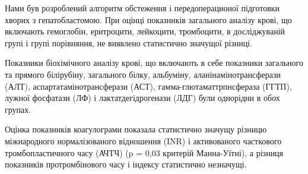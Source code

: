 Нами був розроблений алгоритм обстеження і передоперационої підготовки хворих з гепатобластомою.
При оцінці показників загального аналізу крові, що включають гемоглобін, еритроцити, лейкоцити, тромбоцити, в досліджуваній групі і групі порівняння, не виявлено статистично значущої різниці.

Показники біохімічного аналізу крові, що включають в себе показники загального та прямого білірубіну, загального білку, альбуміну, аланінамінотрансферази (АЛТ), аспартатамінотрансферази (АСТ), гамма-глютаматтрпнсфераза (ГГТП), лужної фосфатази (ЛФ) і лактатдегідрогенази (ЛДГ) були однорідни в обох групах.

Оцінка показників коагулограми показала статистично значущу різницю міжнародного нормалізованого відношення (INR) і активованого часткового тромбопластичного часу (АЧТЧ) (p = 0,03 критерій Манна-Уїтні), а різниця показників протромбінового часу і індексу статистично незначущі. 


